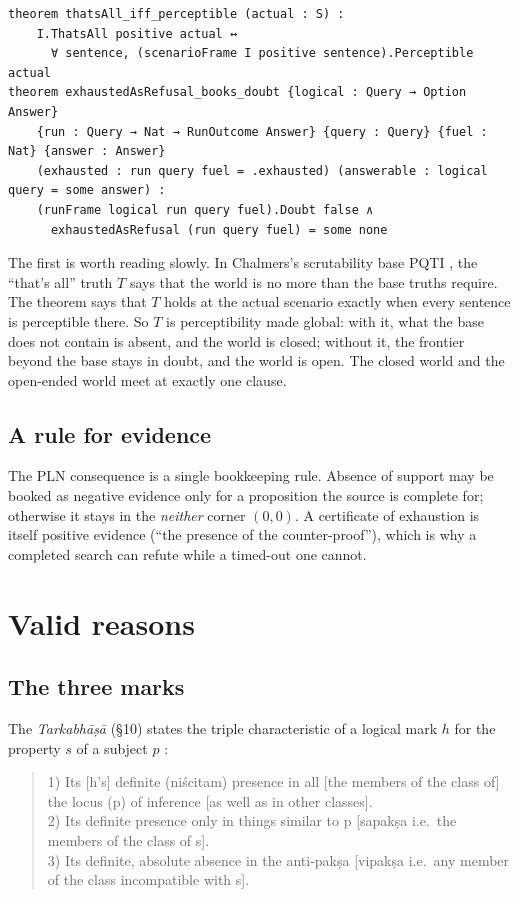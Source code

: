 \documentclass[11pt]{article}
\theoremstyle{plain}
\theoremstyle{definition}
\begin{document}
\begin{lstlisting}
theorem thatsAll_iff_perceptible (actual : S) :
    I.ThatsAll positive actual ↔
      ∀ sentence, (scenarioFrame I positive sentence).Perceptible actual
theorem exhaustedAsRefusal_books_doubt {logical : Query → Option Answer}
    {run : Query → Nat → RunOutcome Answer} {query : Query} {fuel : Nat} {answer : Answer}
    (exhausted : run query fuel = .exhausted) (answerable : logical query = some answer) :
    (runFrame logical run query fuel).Doubt false ∧
      exhaustedAsRefusal (run query fuel) = some none
\end{lstlisting}

\noindent The first is worth reading slowly. In Chalmers's scrutability base PQTI
\cite{Chalmers2012}, the ``that's all'' truth $T$ says that the world is no more than the
base truths require. The theorem says that $T$ holds at the actual scenario exactly when
every sentence is perceptible there. So $T$ is perceptibility made global: with it, what the
base does not contain is absent, and the world is closed; without it, the frontier beyond
the base stays in doubt, and the world is open. The closed world and the open-ended world
meet at exactly one clause.

\subsection{A rule for evidence}

The PLN consequence is a single bookkeeping rule. Absence of support may be booked as
negative evidence only for a proposition the source is complete for; otherwise it stays in
the \emph{neither} corner $(0,0)$. A certificate of exhaustion is itself positive evidence
(``the presence of the counter-proof''), which is why a completed search can refute while a
timed-out one cannot.

\section{Valid reasons}
\label{sec:reasons}

\subsection{The three marks}

The \emph{Tarkabhāṣā} (§10) states the triple characteristic of a logical mark $h$ for the
property $s$ of a subject $p$ \cite{Kajiyama1966}:

\begin{quote}
1) Its [h's] definite (niścitam) presence in all [the members of the class of] the locus
(p) of inference [as well as in other classes].\\
2) Its definite presence only in things similar to p [sapakṣa i.e.\ the members of the
class of s].\\
3) Its definite, absolute absence in the anti-pakṣa [vipakṣa i.e.\ any member of the class
incompatible with s].
\end{quote}
\end{document}
